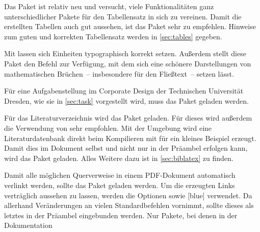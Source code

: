\documentclass[%
  english,ngerman,%
  geometry=no,DIV=12,automark,%
]{tudscrartcl}
\begin{document}
%
\begin{Excerpt*}
\usepackage{fixltx2e}
\end{Excerpt*}
%
Das Paket  ist relativ neu und versucht, viele Funktionalitäten 
ganz unterschiedlicher Pakete für den Tabellensatz in sich zu vereinen. Damit 
die erstellten Tabellen auch gut aussehen, ist das Paket  
sehr zu empfehlen. Hinweise zum guten und korrekten Tabellensatz werden in 
\autoref{sec:tables} gegeben.
%
\begin{Excerpt*}
\usepackage{tabu}
\usepackage{booktabs}
\end{Excerpt*}
%
Mit  lassen sich Einheiten typographisch korrekt setzen. 
Außerdem stellt diese Paket den Befehl  zur Verfügung, mit dem 
sich eine schönere Darstellungen von mathematischen Brüchen~-- insbesondere für 
den Fließtext~-- setzen lässt.
%
\begin{Excerpt*}
\usepackage{units}
\end{Excerpt*}
%
Für eine Aufgabenstellung im Corporate Design der Technischen Universität 
Dresden, wie sie in \autoref{sec:task} vorgestellt wird, muss das Paket 
 geladen werden.
%
\begin{Excerpt*}
\usepackage{tudscrsupervisor}
\end{Excerpt*}
%
Für das Literaturverzeichnis wird das Paket  geladen. Für 
dieses wird außerdem die Verwendung von  sehr empfohlen. Mit 
der Umgebung  wird eine Literaturdatenbank 
 direkt beim Kompilieren mit  für ein 
kleines Beispiel erzeugt. Damit dies im Dokument selbst und nicht nur in der 
Präambel erfolgen kann, wird das Paket  geladen. Alles 
Weitere dazu ist in \autoref{sec:biblatex} zu finden.
%
\begin{Excerpt*}
\usepackage{csquotes}
\usepackage[backend=biber,style=alphabetic]{biblatex}
\usepackage{filecontents}

\end{Excerpt*}
%
Damit alle möglichen Querverweise in einem PDF-Dokument automatisch verlinkt 
werden, sollte das Paket  geladen werden. Um die erzeugten 
Links verträglich aussehen zu lassen, werden die Optionen  
sowie [blue] verwendet. Da  allerhand 
Veränderungen an vielen Standardbefehlen vornimmt, sollte dieses als letztes in 
der Präambel eingebunden werden. Nur Pakete, bei denen in der Dokumentation 
\end{document}
